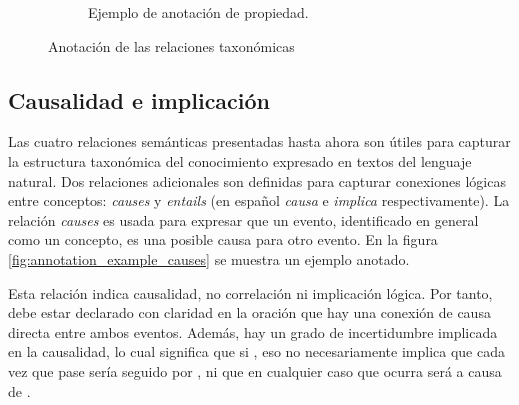 \begin{figure}[H]
\begin{subfigure}{3.9in}
		\caption{Ejemplo de anotación de propiedad.}
		\label{fig:annotation_example_has_property}
	\end{subfigure}
	\caption{Anotación de las relaciones taxonómicas}
\end{figure}

\subsection{Causalidad e implicación}
Las cuatro relaciones semánticas presentadas hasta ahora son útiles para capturar la estructura taxonómica del conocimiento expresado en textos del lenguaje natural. Dos relaciones adicionales son definidas para capturar conexiones lógicas entre conceptos: {\it causes} y {\it entails} (en español {\it causa} e {\it implica} respectivamente). La relación {\it causes} es usada para expresar que un evento, identificado en general como un concepto, es una posible causa para otro evento. En la figura \ref{fig:annotation_example_causes} se muestra un ejemplo anotado.

Esta relación indica causalidad, no correlación ni implicación lógica. Por tanto, debe estar declarado con claridad en la oración que hay una conexión de causa directa entre ambos eventos. Además, hay un grado de incertidumbre implicada en la causalidad, lo cual significa que si , eso no necesariamente implica que cada vez que pase  sería seguido por , ni que en cualquier caso que ocurra  será a causa de .

